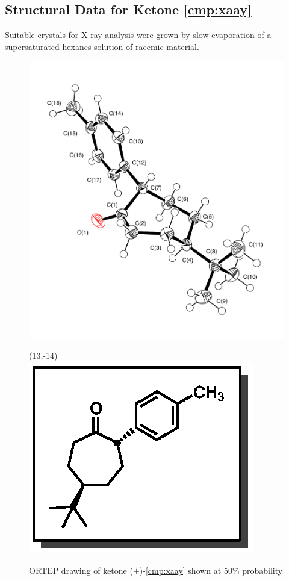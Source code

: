 \subsection{Structural Data for Ketone \ref{cmp:xaay}}
Suitable crystals for X-ray analysis were grown by slow evaporation of a supersaturated hexanes
solution of racemic material. 
\begin{figure}[h]
  \centering
  \includegraphics[width=4.5in]{chp_asymmetric/images/xray/xaax_labelled}
    \begin{textblock}{1}(13,-14)
\includegraphics[scale=0.8]{chp_asymmetric/images/xaax}
\end{textblock}
  \caption{ORTEP drawing of ketone ($\pm$)-\ref{cmp:xaay} shown at 50\% probability }
\end{figure}
